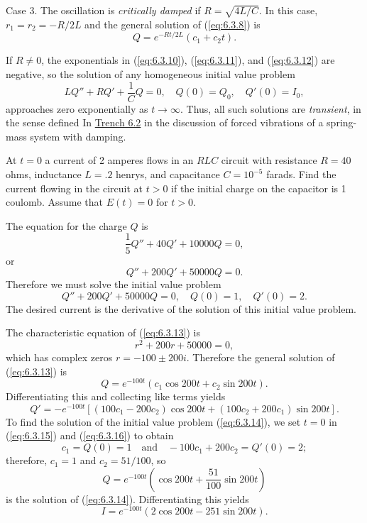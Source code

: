 \documentclass{ximera}
\begin{document}
Case 3.
The oscillation is \textit{critically damped} if $R=\sqrt{4L/C}$. In
this case, $r_1=r_2=-R/2L$ and the general solution of (\ref{eq:6.3.8}) is
\begin{equation}\label{eq:6.3.12}
Q=e^{-Rt/2L}(c_1+c_2t).
\end{equation}

If $R\neq 0$, the exponentials in (\ref{eq:6.3.10}), (\ref{eq:6.3.11}),
and
(\ref{eq:6.3.12}) are negative, so the solution of any homogeneous initial
value problem
$$
 LQ''+RQ'+\frac{1}{C}Q=0,\quad Q(0)=Q_0,\quad Q'(0)=I_0,
$$
approaches zero exponentially as $t\rightarrow\infty$. Thus, all such
solutions are \textit{transient}, in the sense defined
In \href{https://ximera.osu.edu/ode/main/springProblemsII/springProblemsII}{Trench 6.2} in the discussion of forced vibrations of a
spring-mass system with damping.

\begin{example}\label{example:6.3.1}
At $t=0$ a current of 2 amperes flows in an $RLC$ circuit with
resistance $R=40$ ohms, inductance $L=.2$ henrys, and capacitance
$C=10^{-5}$ farads. Find the current flowing in the circuit at $t>0$
if the initial charge on the capacitor is 1 coulomb. Assume that
$E(t)=0$ for $t>0$.

\begin{explanation} The equation for the charge $Q$ is $$\frac{1}{5}Q''+40Q'+10000Q=0, $$ or
\begin{equation} \label{eq:6.3.13}
Q''+200Q'+50000Q=0.
\end{equation}
Therefore we must solve the initial value problem
\begin{equation} \label{eq:6.3.14}
Q''+200Q'+50000Q=0,\quad Q(0)=1,\quad Q'(0)=2.
\end{equation}
The desired current is the derivative of the solution of this initial
value problem.

The characteristic equation of (\ref{eq:6.3.13}) is
$$
r^2+200r+50000=0,
$$
which has complex zeros $r=-100\pm200i$. Therefore the general
solution of (\ref{eq:6.3.13}) is
\begin{equation} \label{eq:6.3.15}
Q=e^{-100t}(c_1\cos200t+c_2\sin200t).
\end{equation}
Differentiating this and collecting like terms yields
\begin{equation} \label{eq:6.3.16}
Q'=-e^{-100t}\left[(100c_1-200c_2)\cos200t+
(100c_2+200c_1)\sin200t\right].
\end{equation}
To find the solution of the initial value problem (\ref{eq:6.3.14}),
we set $t=0$ in (\ref{eq:6.3.15}) and (\ref{eq:6.3.16}) to obtain
$$
c_1=Q(0)=1\quad\mbox{and}\quad   -100c_1+200c_2=Q'(0)=2;
$$
therefore, $c_1=1$ and $c_2=51/100$, so
$$
Q=e^{-100t}\left(\cos200t+\frac{51}{100}\sin200t\right)
$$
is the solution of (\ref{eq:6.3.14}).
Differentiating this yields
$$
I=e^{-100t}(2\cos200t-251\sin200t).
$$
\end{explanation}
\end{example}
\end{document}
